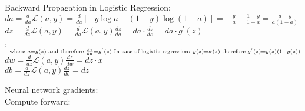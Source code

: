 \documentclass{article}
\begin{document}
Backward Propagation in Logistic Regression:\\

$da = \frac{d}{da}\mathcal{L}(a,y) = \frac{d}{da}[-y\log{a} -(1-y)\log(1-a)]=-\frac{y}{a} +\frac{1-y}{1-a} = \frac{a-y}{a(1-a)}$\\

$dz = \frac{d}{dz}\mathcal{L}(a,y) = \frac{d}{da}\mathcal{L}(a,y) \frac{dz}{da}= da \cdot \frac{dz}{da} = da \cdot g^{'}(z)$\\

,$\hspace{2mm} _{\text{where} \hspace{1mm} a=g(z) \hspace{1mm}\text{and therefore\hspace{1mm}} \frac{dz}{da} = g^{'}(z) \hspace{1mm} \text{In case of logistic regression: } g(z) = \sigma(z), \text{therefore } g^{'}(z) = g(z)(1-g(z))}$\\

$dw = \frac{d}{dz}\mathcal{L}(a,y) \frac{dz}{dw} = dz\cdot x$\\

$db = \frac{d}{dz}\mathcal{L}(a,y) \frac{dz}{db} = dz$\\


\newpage

Neural network gradients:\\

Compute forward:\\

\end{document}
